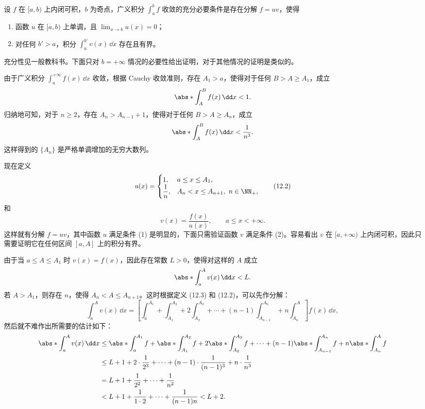 \begin{xproposition}
设 $f$ 在 $[a,b)$ 上内闭可积，$b$ 为奇点，广义积分 $\int_a^b f$ 收敛的充分必要条件是存在分解 $f=uv$，使得
\begin{enumerate}[label=(\arabic*)]
  \item 函数 $u$ 在 $[a,b)$ 上单调，且 $\lim_{x\to b}u(x)=0$；
  \item 对任何 $b'>a$，积分 $\int_a^{b'}v(x)\,\dd x$ 存在且有界。
\end{enumerate}
\end{xproposition}
\begin{xproof}
充分性见一般教科书。下面只对 $b=+\infty$ 情况的必要性给出证明，对于其他情况的证明是类似的。

由于广义积分 $\int_a^{+\infty}f(x)\,\dd x$ 收敛，根据 Cauchy 收敛准则，存在 $A_1>a$，使得对于任何 $B>A\geq A_1$，成立
\[
  \abs*{\int_A^B f(x)\,\dd x}<1.
\]
归纳地可知，对于 $n\geq2$，存在 $A_n>A_{n-1}+1$，使得对于任何 $B>A\geq A_n$，成立
\[
  \abs*{\int_A^B f(x)\,\dd x}<\frac1{n^3}.
\]
这样得到的 $\{A_n\}$ 是严格单调增加的无穷大数列。

现在定义
\begin{equation}
  u(x)=
  \begin{cases}
    1, & a\leq x\leq A_1,\\
    \dfrac1n, & A_n<x\leq A_{n+1},\ n\in\NN_+,
  \end{cases}
  \tag{12.2}
  \label{eq:12.2}
\end{equation}
和
\begin{equation}
  v(x)=\frac{f(x)}{u(x)},\qquad a\leq x<+\infty.
  \tag{12.3}
  \label{eq:12.3}
\end{equation}
这样就有分解 $f=uv$，其中函数 $u$ 满足条件 (1) 是明显的，下面只需验证函数 $v$ 满足条件 (2)。容易看出 $v$ 在 $[a,+\infty)$ 上内闭可积，因此只需要证明它在任何区间 $[a,A]$ 上的积分有界。

由于当 $a\leq A\leq A_1$ 时 $v(x)=f(x)$，因此存在常数 $L>0$，使得对这样的 $A$ 成立
\[
  \abs*{\int_a^A v(x)\,\dd x}<L.
\]
若 $A>A_1$，则存在 $n$，使得 $A_n<A\leq A_{n+1}$。这时根据定义 (12.3) 和 (12.2)，可以先作分解：
\[
  \int_a^A v(x)\,\dd x
  =\left[\int_a^{A_1}+\int_{A_1}^{A_2}+2\int_{A_2}^{A_3}+\cdots+(n-1)\int_{A_{n-1}}^{A_n}+n\int_{A_n}^A\right]f(x)\,\dd x,
\]
然后就不难作出所需要的估计如下：
\begin{align*}
  \abs*{\int_a^A v(x)\,\dd x}
  &\leq \abs*{\int_a^{A_1}f}
   +\abs*{\int_{A_1}^{A_2}f}
   +2\abs*{\int_{A_2}^{A_3}f}+\cdots
   +(n-1)\abs*{\int_{A_{n-1}}^{A_n}f}
   +n\abs*{\int_{A_n}^Af}\\
  &\leq L+1+2\cdot\frac1{2^3}+\cdots+(n-1)\cdot\frac1{(n-1)^3}+n\cdot\frac1{n^3}\\
  &=L+1+\frac1{2^2}+\cdots+\frac1{n^2}\\
  &<L+1+\frac1{1\cdot2}+\cdots+\frac1{(n-1)n}<L+2.
\end{align*}
\end{xproof}

